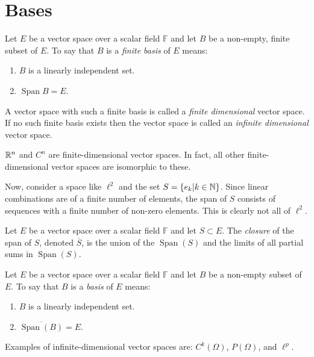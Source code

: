 \documentclass[letterpaper,12pt,fleqn]{article}
\newcommand{\F}{\mathbb{F}}
\newcommand{\cl}[1]{\overline{#1}}
\renewcommand{\O}{\Omega}
\DeclareMathOperator{\spn}{Span}
\begin{document}
\section*{Bases}

\begin{definition}
  Let $E$ be a vector space over a scalar field $\F$ and let $B$ be a
  non-empty, finite subset of $E$. To say that $B$ is a \emph{finite basis} of
  $E$ means:
  \begin{enumerate}
  \item $B$ is a linearly independent set.
  \item $\spn{B}=E$.
  \end{enumerate}
  A vector space with such a finite basis is called a \emph{finite dimensional}
  vector space. If no such finite basis exists then the vector space is called
  an \emph{infinite dimensional} vector space.
\end{definition}

$\mathbb{R}^n$ and $C^n$ are finite-dimensional vector spaces. In fact, all other
finite-dimensional vector spaces are isomorphic to these.

Now, consider a space like $\ell^2$ and the set $S=\{e_k|k\in\mathbb{N}\}$. Since
linear combinations are of a finite number of elements, the span of $S$
consists of sequences with a finite number of non-zero elements. This is
clearly not all of $\ell^2$.

\begin{definition}[Closure]
  Let $E$ be a vector space over a scalar field $\F$ and let $S\subset E$. The
  \emph{closure} of the span of $S$, denoted $\cl{S}$, is the union of the
  $\spn(S)$ and the limits of all partial sums in $\spn(S)$.
\end{definition}

\begin{definition}[Basis]
  Let $E$ be a vector space over a scalar field $\F$ and let $B$ be a non-empty
  subset of $E$. To say that $B$ is a \emph{basis} of $E$ means:
  \begin{enumerate}
  \item $B$ is a linearly independent set.
  \item $\cl{\spn(B)}=E$.
  \end{enumerate}
\end{definition}

Examples of infinite-dimensional vector spaces are: $C^k(\O)$, $P(\O)$, and
$\ell^p$.
\end{document}
